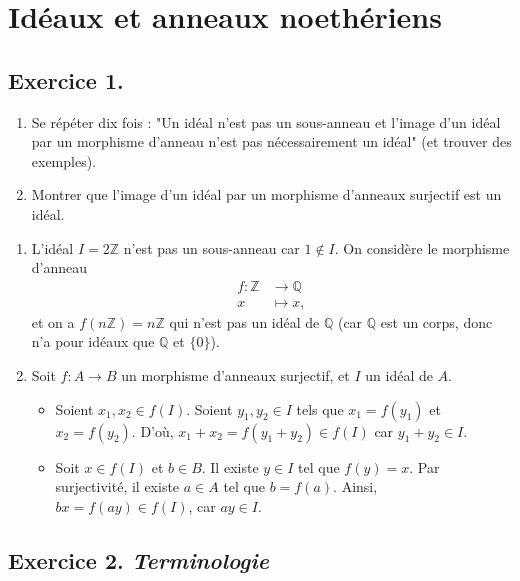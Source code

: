 \documentclass[./main]{subfiles}
\begin{document}
  \chapter{Idéaux et anneaux noethériens}

  \section{Exercice 1.}

  \begin{enonce}
    \begin{enumerate}
      \item Se répéter dix fois : "Un idéal n'est pas un sous-anneau et l'image d'un idéal par un morphisme d'anneau n'est pas nécessairement un idéal" (et trouver des exemples).
      \item Montrer que l'image d'un idéal par un morphisme d'anneaux surjectif est un idéal.
    \end{enumerate}
  \end{enonce}

  \begin{enumerate}
    \item L'idéal $I = 2\mathds{Z}$ n'est pas un sous-anneau car $1 \not\in I$.
      On considère le morphisme d'anneau \begin{align*}
        f: \mathds{Z} &\longrightarrow \mathds{Q} \\
        x &\longmapsto x
      ,\end{align*}
      et on a $f(n\mathds{Z}) = n \mathds{Z}$ qui n'est pas un idéal de $\mathds{Q}$ (car $\mathds{Q}$ est un corps, donc n'a pour idéaux que $\mathds{Q}$ et $\{0\}$).
    \item Soit $f : A \to B$ un morphisme d'anneaux surjectif, et $I$ un idéal de $A$.
      \begin{itemize}
        \item Soient $x_1, x_2 \in f(I)$. Soient $y_1, y_2 \in I$ tels que $x_1 = f(y_1)$ et $x_2 = f(y_2)$.
          D'où, $x_1 + x_2 = f(y_1 + y_2) \in f(I)$ car $y_1 + y_2 \in I$.
        \item Soit $x \in f(I)$ et $b \in B$. Il existe $y \in I$ tel que $f(y) = x$.
          Par surjectivité, il existe $a \in A$ tel que $b = f(a)$.
          Ainsi, $bx = f(ay) \in f(I)$, car $ay \in I$.
      \end{itemize}
  \end{enumerate}

  \section{Exercice 2. \textit{Terminologie}}
\end{document}
